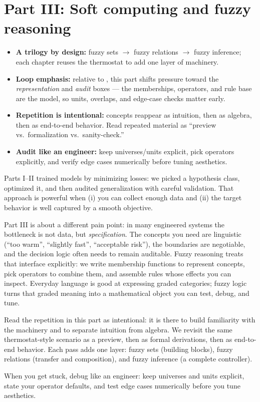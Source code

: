 \part*{Part III: Soft computing and fuzzy reasoning}
\begin{tcolorbox}[summarybox, title={How to read Part III (rolling window)}]
\begin{itemize}
  \item \textbf{A trilogy by design:} fuzzy sets \(\rightarrow\) fuzzy relations \(\rightarrow\) fuzzy inference; each chapter reuses the thermostat to add one layer of machinery.
  \item \textbf{Loop emphasis:} relative to , this part shifts pressure toward the \emph{representation} and \emph{audit} boxes --- the memberships, operators, and rule base are the model, so units, overlaps, and edge-case checks matter early.
  \item \textbf{Repetition is intentional:} concepts reappear as intuition, then as algebra, then as end-to-end behavior. Read repeated material as ``preview vs.\ formalization vs.\ sanity-check.''
  \item \textbf{Audit like an engineer:} keep universes/units explicit, pick operators explicitly, and verify edge cases numerically before tuning aesthetics.
\end{itemize}
\end{tcolorbox}
\begin{tcolorbox}[summarybox, title={Part III bridge: specification becomes the model}]
Parts I--II trained models by minimizing losses: we picked a hypothesis class, optimized it, and then audited
generalization with careful validation. That approach is powerful when (i) you can collect enough data and
(ii) the target behavior is well captured by a smooth objective.

Part III is about a different pain point: in many engineered systems the bottleneck is not data, but
\emph{specification}. The concepts you need are linguistic (``too warm'', ``slightly fast'', ``acceptable
risk''), the boundaries are negotiable, and the decision logic often needs to remain auditable. Fuzzy
reasoning treats that interface explicitly: we write membership functions to represent concepts, pick
operators to combine them, and assemble rules whose effects you can inspect. Everyday language is good at
expressing graded categories; fuzzy logic turns that graded meaning into a mathematical object you can test,
debug, and tune.

Read the repetition in this part as intentional: it is there to build familiarity with the machinery and to
separate intuition from algebra. We revisit the same thermostat-style scenario as a preview, then as formal
derivations, then as end-to-end behavior. Each pass adds one layer: fuzzy sets (building blocks), fuzzy
relations (transfer and composition), and fuzzy inference (a complete controller).

When you get stuck, debug like an engineer: keep universes and units explicit, state your operator defaults,
and test edge cases numerically before you tune aesthetics.
\end{tcolorbox}
